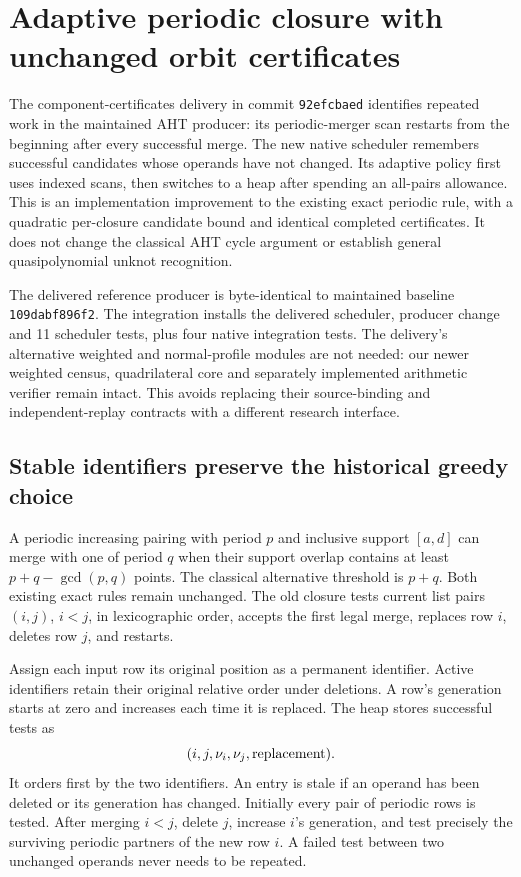 \section{Adaptive periodic closure with unchanged orbit certificates}
\label{sec:adaptive-merger}

The component-certificates delivery in commit \texttt{92efcbaed} identifies
repeated work in the maintained AHT producer: its periodic-merger scan restarts
from the beginning after every successful merge. The new native scheduler
remembers successful candidates whose operands have not changed. Its adaptive
policy first uses indexed scans, then switches to a heap after spending an
all-pairs allowance. This is an implementation improvement to the existing
exact periodic rule, with a quadratic per-closure candidate bound and identical
completed certificates. It does not change the classical AHT cycle argument
or establish general quasipolynomial unknot recognition.

The delivered reference producer is byte-identical to maintained baseline
\texttt{109dabf896f2}. The integration installs the delivered scheduler,
producer change and 11 scheduler tests, plus four native integration tests.
The delivery's alternative weighted and normal-profile modules are not needed:
our newer weighted census, quadrilateral core and separately implemented
arithmetic verifier remain intact. This avoids replacing their source-binding
and independent-replay contracts with a different research interface.

\subsection{Stable identifiers preserve the historical greedy choice}

A periodic increasing pairing with period $p$ and inclusive support $[a,d]$
can merge with one of period $q$ when their support overlap contains at least
$p+q-\gcd(p,q)$ points. The classical alternative threshold is $p+q$.
Both existing exact rules remain unchanged. The old closure tests current
list pairs $(i,j)$, $i<j$, in lexicographic order, accepts the first legal
merge, replaces row $i$, deletes row $j$, and restarts.

Assign each input row its original position as a permanent identifier.
Active identifiers retain their original relative order under deletions.
A row's generation starts at zero and increases each time it is replaced.
The heap stores successful tests as
\[
 (i,j,\nu_i,\nu_j,\hbox{replacement}).
\]
It orders first by the two identifiers. An entry is stale if an operand has
been deleted or its generation has changed. Initially every pair of periodic
rows is tested. After merging $i<j$, delete $j$, increase $i$'s generation,
and test precisely the surviving periodic partners of the new row $i$.
A failed test between two unchanged operands never needs to be repeated.

